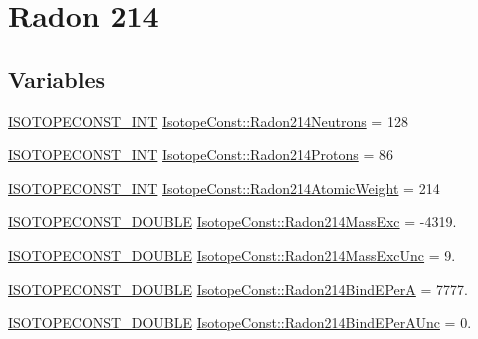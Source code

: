 \hypertarget{group___isotope_const-_radon-_rn214}{}\section{Radon 214}
\label{group___isotope_const-_radon-_rn214}
\subsection*{Variables}
\begin{DoxyCompactItemize}
\item 
\mbox{\hyperlink{group___isotope_const-_macros_ga5f18360b3e99483a35c32d789e62621c}{I\+S\+O\+T\+O\+P\+E\+C\+O\+N\+S\+T\+\_\+\+I\+NT}} \mbox{\hyperlink{group___isotope_const-_radon-_rn214_ga30a0ff29418e56f3d8c13c5e159bc6cf}{Isotope\+Const\+::\+Radon214\+Neutrons}} = 128
\item 
\mbox{\hyperlink{group___isotope_const-_macros_ga5f18360b3e99483a35c32d789e62621c}{I\+S\+O\+T\+O\+P\+E\+C\+O\+N\+S\+T\+\_\+\+I\+NT}} \mbox{\hyperlink{group___isotope_const-_radon-_rn214_ga7bb94390235652745711a8b4e6523457}{Isotope\+Const\+::\+Radon214\+Protons}} = 86
\item 
\mbox{\hyperlink{group___isotope_const-_macros_ga5f18360b3e99483a35c32d789e62621c}{I\+S\+O\+T\+O\+P\+E\+C\+O\+N\+S\+T\+\_\+\+I\+NT}} \mbox{\hyperlink{group___isotope_const-_radon-_rn214_gaa73e996eef0173f4549a6b8cb3f03266}{Isotope\+Const\+::\+Radon214\+Atomic\+Weight}} = 214
\item 
\mbox{\hyperlink{group___isotope_const-_macros_ga8f45a7272ce02c0b4c65c44636ed719a}{I\+S\+O\+T\+O\+P\+E\+C\+O\+N\+S\+T\+\_\+\+D\+O\+U\+B\+LE}} \mbox{\hyperlink{group___isotope_const-_radon-_rn214_gab5700a710cd77de3ed601241f713d734}{Isotope\+Const\+::\+Radon214\+Mass\+Exc}} = -\/4319.
\item 
\mbox{\hyperlink{group___isotope_const-_macros_ga8f45a7272ce02c0b4c65c44636ed719a}{I\+S\+O\+T\+O\+P\+E\+C\+O\+N\+S\+T\+\_\+\+D\+O\+U\+B\+LE}} \mbox{\hyperlink{group___isotope_const-_radon-_rn214_gad2bd698836fd0d7080dba80bee629573}{Isotope\+Const\+::\+Radon214\+Mass\+Exc\+Unc}} = 9.
\item 
\mbox{\hyperlink{group___isotope_const-_macros_ga8f45a7272ce02c0b4c65c44636ed719a}{I\+S\+O\+T\+O\+P\+E\+C\+O\+N\+S\+T\+\_\+\+D\+O\+U\+B\+LE}} \mbox{\hyperlink{group___isotope_const-_radon-_rn214_ga91b4aca0da15f56854d87e3dc9942e4b}{Isotope\+Const\+::\+Radon214\+Bind\+E\+PerA}} = 7777.
\item 
\mbox{\hyperlink{group___isotope_const-_macros_ga8f45a7272ce02c0b4c65c44636ed719a}{I\+S\+O\+T\+O\+P\+E\+C\+O\+N\+S\+T\+\_\+\+D\+O\+U\+B\+LE}} \mbox{\hyperlink{group___isotope_const-_radon-_rn214_ga15d3c7019625a4a1750cae24048a65fa}{Isotope\+Const\+::\+Radon214\+Bind\+E\+Per\+A\+Unc}} = 0.

\end{DoxyCompactItemize}
